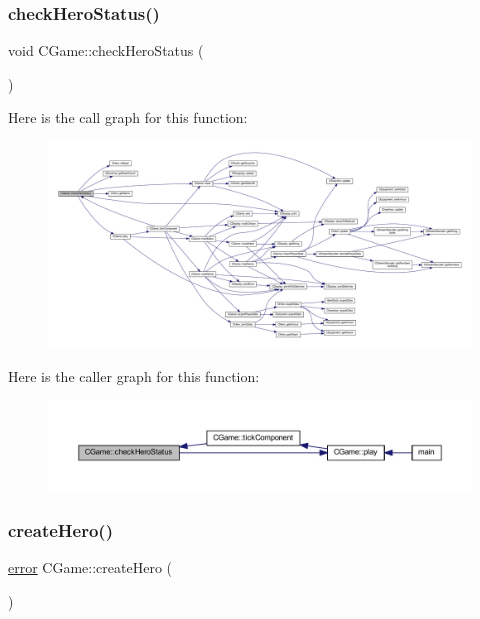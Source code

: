 \subsubsection{\texorpdfstring{check\+Hero\+Status()}{checkHeroStatus()}}
{\footnotesize\ttfamily void C\+Game\+::check\+Hero\+Status (\begin{DoxyParamCaption}{ }\end{DoxyParamCaption})\hspace{0.3cm}{\ttfamily [protected]}}

Here is the call graph for this function\+:\nopagebreak
\begin{figure}[H]
\begin{center}
\leavevmode
\includegraphics[width=350pt]{class_c_game_ac0a8028013ca5a7c135c29fa582df4a0_cgraph}
\end{center}
\end{figure}
Here is the caller graph for this function\+:\nopagebreak
\begin{figure}[H]
\begin{center}
\leavevmode
\includegraphics[width=350pt]{class_c_game_ac0a8028013ca5a7c135c29fa582df4a0_icgraph}
\end{center}
\end{figure}
\mbox{\label{class_c_game_a21a30939333b2c98f607d9bd2927d105}} 
\subsubsection{\texorpdfstring{create\+Hero()}{createHero()}}
{\footnotesize\ttfamily \mbox{\hyperlink{_errors_list_8h_af10dacfa214e2575bb2e0ee407c242e0}{error}} C\+Game\+::create\+Hero (\begin{DoxyParamCaption}{ }\end{DoxyParamCaption})\hspace{0.3cm}{\ttfamily [protected]}}


